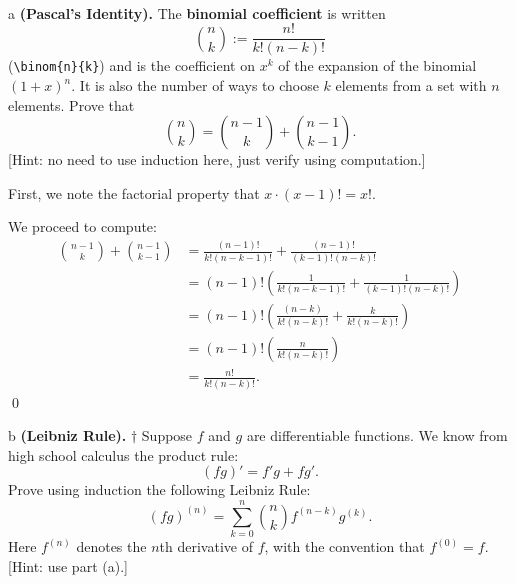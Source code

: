 \documentclass{article}
\begin{document}
\
\hline
\section{}

\begin{problem} a
\textbf{(Pascal's Identity).} The \textbf{binomial coefficient} is written \[\binom{n}{k}:=\frac{n!}{k!(n-k)!}\] (\verb|\binom{n}{k}|) and is the coefficient on $x^k$ of the expansion of the binomial $(1+x)^n$. It is also the number of ways to choose $k$ elements from a set with $n$ elements. Prove that \[\binom{n}{k}=\binom{n-1}{k}+\binom{n-1}{k-1}.\] [Hint: no need to use induction here, just verify using computation.]
\end{problem}

First, we note the factorial property that $x\cdot (x-1)!=x!$.

We proceed to compute:
\begin{align*}
    \binom{n-1}{k} +\binom{n-1}{k-1} & =\frac{( n-1) !}{k!( n-k-1) !} +\frac{( n-1) !}{( k-1) !( n-k) !}\\
     & =( n-1) !\left(\frac{1}{k!( n-k-1) !} +\frac{1}{( k-1) !( n-k) !}\right)\\
     & =( n-1) !\left(\frac{( n-k)}{k!( n-k) !} +\frac{k}{k!( n-k) !}\right)\\
     & =( n-1) !\left(\frac{n}{k!( n-k) !}\right)\\
 & =\frac{n!}{k!( n-k) !} .
\end{align*} \qed

\begin{problem} b
\textbf{(Leibniz Rule).} $\dagger$ Suppose $f$ and $g$ are differentiable functions. We know from high school calculus the product rule: \[(fg)'=f'g+fg'.\] Prove using induction the following Leibniz Rule: \[(fg)^{(n)}=\sum_{k=0}^n \binom{n}{k}f^{(n-k)}g^{(k)}.\] Here $f^{(n)}$ denotes the $n$th derivative of $f$, with the convention that $f^{(0)}=f$. [Hint: use part (a).]
\end{problem}


\
\hline
\end{document}
